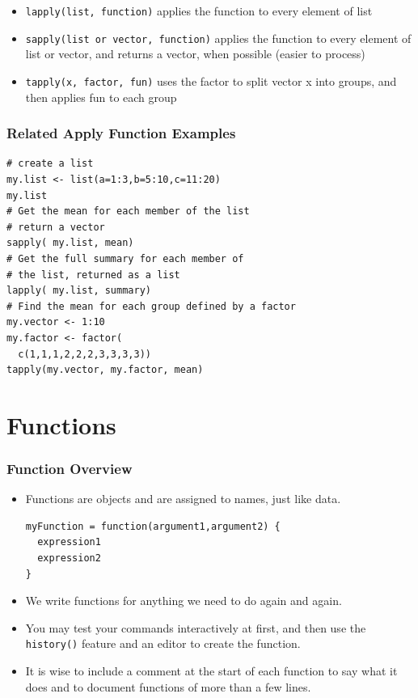 \documentclass[]{article}
\theoremstyle{definition}
\theoremstyle{definition}
\theoremstyle{remark}
\begin{document}
\begin{itemize}
\item
  {\texttt{lapply(list,\ function)} applies the function to every
  element of list}
\item
  {\texttt{sapply(list\ or\ vector,\ function)} applies the function to
  every element of list or vector, and returns a vector, when possible
  (easier to process)}
\item
  {\texttt{tapply(x,\ factor,\ fun)} uses the factor to split vector x
  into groups, and then applies fun to each group}
\end{itemize}

\subsubsection{Related Apply Function
Examples}\label{related-apply-function-examples}

\begin{verbatim}
# create a list
my.list <- list(a=1:3,b=5:10,c=11:20)
my.list
# Get the mean for each member of the list
# return a vector
sapply( my.list, mean)
# Get the full summary for each member of
# the list, returned as a list
lapply( my.list, summary)
# Find the mean for each group defined by a factor
my.vector <- 1:10
my.factor <- factor(
  c(1,1,1,2,2,2,3,3,3,3))
tapply(my.vector, my.factor, mean)
\end{verbatim}

\section{Functions}\label{functions}

\subsubsection{Function Overview}\label{function-overview}

\begin{itemize}
\item
  {Functions are objects and are assigned to names, just like data.}

\begin{verbatim}
myFunction = function(argument1,argument2) {
  expression1
  expression2
}
\end{verbatim}
\item
  {We write functions for anything we need to do again and again.}
\item
  {You may test your commands interactively at first, and then use the
  \texttt{history()} feature and an editor to create the function.}
\item
  {It is wise to include a comment at the start of each function to say
  what it does and to document functions of more than a few lines.}
\end{itemize}
\end{document}
